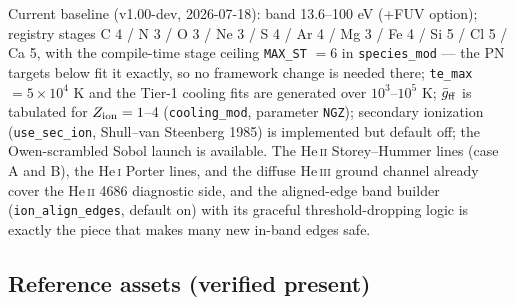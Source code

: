 \documentclass[english,a4paper]{my_memo}
\newcommand{\code}[1]{\texttt{#1}}
\newcommand{\HeI}{He\,\textsc{i}}
\newcommand{\HeII}{He\,\textsc{ii}}
\newcommand{\HeIII}{He\,\textsc{iii}}
\begin{document}
Current baseline (v1.00-dev, 2026-07-18): band 13.6--100 eV (+FUV
option); registry stages C 4 / N 3 / O 3 / Ne 3 / S 4 / Ar 4 / Mg 3 /
Fe 4 / Si 5 / Cl 5 / Ca 5, with the compile-time stage ceiling
\code{MAX\_ST} $=6$ in \code{species\_mod} --- the PN targets below fit
it exactly, so no framework change is needed there; \code{te\_max}
$=5\times10^4$ K and the Tier-1 cooling fits are generated over
$10^3$--$10^5$ K; $\bar g_{\rm ff}$ is tabulated for $Z_{\rm ion}=1$--4
(\code{cooling\_mod}, parameter \code{NGZ}); secondary ionization
(\code{use\_sec\_ion}, Shull--van Steenberg 1985) is implemented but
default off; the Owen-scrambled Sobol launch is available.  The \HeII{}
Storey--Hummer lines (case A and B), the \HeI{} Porter lines, and the
diffuse \HeIII{} ground channel already cover the \HeII{} 4686
diagnostic side, and the aligned-edge band builder
(\code{ion\_align\_edges}, default on) with its graceful
threshold-dropping logic is exactly the piece that makes many new
in-band edges safe.

\subsection{Reference assets (verified present)}
\end{document}
